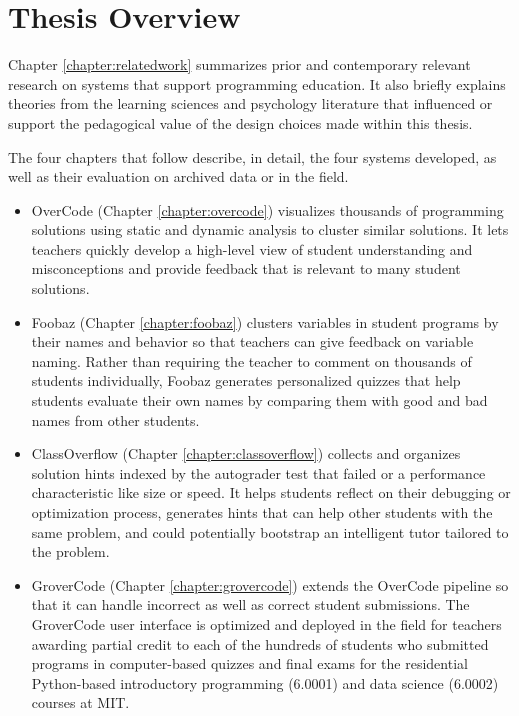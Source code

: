 \section{Thesis Overview}

Chapter \ref{chapter:relatedwork} summarizes prior and contemporary relevant research on systems that support programming education. It also briefly explains theories from the learning sciences and psychology literature that influenced or support the pedagogical value of the design choices made within this thesis.

The four chapters that follow describe, in detail, the four systems developed, as well as their evaluation on archived data or in the field.

\begin{itemize}
\item OverCode (Chapter \ref{chapter:overcode}) visualizes thousands of programming solutions using static and dynamic analysis to cluster similar solutions. It lets teachers quickly develop a high-level view of student understanding and misconceptions and provide feedback that is relevant to many student solutions. 

\item Foobaz (Chapter \ref{chapter:foobaz}) clusters variables in student programs by their names and behavior so that teachers can give feedback on variable naming. Rather than requiring the teacher to comment on thousands of students individually, Foobaz generates personalized quizzes that help students evaluate their own names by comparing them with good and bad names from other students. 

\item ClassOverflow (Chapter \ref{chapter:classoverflow}) collects and organizes solution hints indexed by the autograder test that failed or a performance characteristic like size or speed. It helps students reflect on their debugging or optimization process, generates hints that can help other students with the same problem, and could potentially bootstrap an intelligent tutor tailored to the problem.

\item GroverCode (Chapter \ref{chapter:grovercode}) extends the OverCode pipeline so that it can handle incorrect as well as correct student submissions. The GroverCode user interface is optimized and deployed in the field for teachers awarding partial credit to each of the hundreds of students who submitted programs in computer-based quizzes and final exams for the residential Python-based introductory programming (6.0001) and data science (6.0002) courses at MIT.
\end{itemize}

